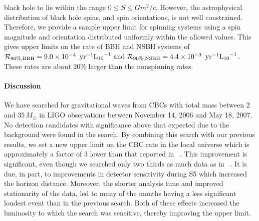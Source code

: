 black hole to lie within the range $0 \le S \le G m^{2}/c$.  However,
the astrophysical distribution of black hole spins, and spin
orientations, is not well constrained.  Therefore, we provide a sample
upper limit for spinning systems using a spin magnitude and orientation
distributed uniformly within the allowed values.  This gives upper
limits on the rate of BBH and NSBH systems of
%
$\mathcal{R}_{90\%,{\rm BBH}} = 9.0 \times 10^{-4}\,
\textrm{ yr}^{-1}\mathrm{L_{10}}^{-1} \text{ and }
\mathcal{R}_{90\%,{\rm NSBH}} =  4.4 \times 10^{-3}\,
\textrm{ yr}^{-1}\mathrm{L_{10}}^{-1} \, .$
%
These rates are about $20\%$ larger than the nonspinning rates.

\paragraph{Discussion}

We have searched for gravitational waves from CBCs with total mass
between $2$ and $35\, M_\odot$ in \ac{LIGO} observations between November
14, 2006 and May 18, 2007.  No detection candidates with significance
above that expected due to the background were found in the search. By
combining this search with our previous results, we set a new upper
limit on the CBC rate in the local universe which is approximately a
factor of $3$ lower than that reported in
~\cite{Collaboration:2009tt}.  This improvement is significant, even
though we searched only two thirds as much data as in
~\cite{Collaboration:2009tt}.  It is due, in part, to improvements
in detector sensitivity during S5 which increased the horizon distance.
Moreover, the shorter analysis time and improved stationarity of
the data, led to many of the months having a less significant loudest
event than in the previous search.  Both of these effects increased the
luminosity to which the search was sensitive, thereby improving the
upper limit.

